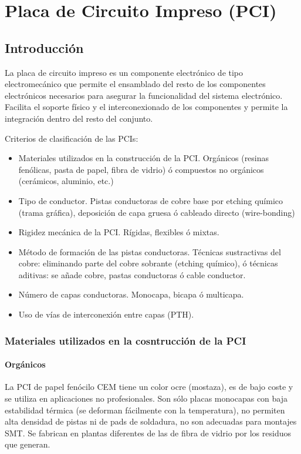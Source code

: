 \chapter{Placa de Circuito Impreso (PCI)}
\section{Introducción}
La placa de circuito impreso es un componente electrónico de tipo electromecánico que permite el ensamblado del resto de los componentes electrónicos necesarios para asegurar la funcionalidad del sistema electrónico. Facilita el soporte físico y el interconexionado de los componentes y permite la integración dentro del resto del conjunto.

Criterios de clasificación de las PCIs:
\begin{itemize}
    \item Materiales utilizados en la construcción de la PCI. Orgánicos (resinas fenólicas, pasta de papel, fibra de vidrio) ó compuestos no orgánicos (cerámicos, aluminio, etc.)
    \item Tipo de conductor. Pistas conductoras de cobre base por etching químico (trama gráfica), deposición de capa gruesa ó cableado directo (wire-bonding)
    \item Rigidez mecánica de la PCI. Rígidas, flexibles ó mixtas.
    \item Método de formación de las pistas conductoras. Técnicas sustractivas del cobre: eliminando parte del cobre sobrante (etching químico), ó técnicas aditivas: se añade cobre, pastas conductoras ó cable conductor.
    \item Número de capas conductoras. Monocapa, bicapa ó multicapa.
    \item Uso de vías de interconexión entre capas (PTH).
\end{itemize}

\subsection{Materiales utilizados en la cosntrucción de la PCI}
\subsubsection{Orgánicos}
La PCI de papel fenócilo CEM tiene un color ocre (mostaza), es de bajo coste y se utiliza en aplicaciones no profesionales. Son sólo placas monocapas con baja estabilidad térmica (se deforman fácilmente con la temperatura), no permiten alta densidad de pistas ni de pads de soldadura, no son adecuadas para montajes SMT. Se fabrican en plantas diferentes de las de fibra de vidrio por los residuos que generan.

